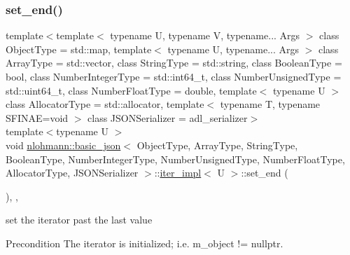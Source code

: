 \subsubsection{\texorpdfstring{set\+\_\+end()}{set\_end()}}
{\footnotesize\ttfamily template$<$template$<$ typename U, typename V, typename... Args $>$ class Object\+Type = std\+::map, template$<$ typename U, typename... Args $>$ class Array\+Type = std\+::vector, class String\+Type  = std\+::string, class Boolean\+Type  = bool, class Number\+Integer\+Type  = std\+::int64\+\_\+t, class Number\+Unsigned\+Type  = std\+::uint64\+\_\+t, class Number\+Float\+Type  = double, template$<$ typename U $>$ class Allocator\+Type = std\+::allocator, template$<$ typename T, typename S\+F\+I\+N\+A\+E=void $>$ class J\+S\+O\+N\+Serializer = adl\+\_\+serializer$>$ \\
template$<$typename U $>$ \\
void \hyperlink{classnlohmann_1_1basic__json}{nlohmann\+::basic\+\_\+json}$<$ Object\+Type, Array\+Type, String\+Type, Boolean\+Type, Number\+Integer\+Type, Number\+Unsigned\+Type, Number\+Float\+Type, Allocator\+Type, J\+S\+O\+N\+Serializer $>$\+::\hyperlink{classnlohmann_1_1basic__json_1_1iter__impl}{iter\+\_\+impl}$<$ U $>$\+::set\+\_\+end (\begin{DoxyParamCaption}{ }\end{DoxyParamCaption})\hspace{0.3cm}{\ttfamily [inline]}, {\ttfamily [private]}, {\ttfamily [noexcept]}}



set the iterator past the last value 

\begin{DoxyPrecond}{Precondition}
The iterator is initialized; i.\+e. {\ttfamily m\+\_\+object != nullptr}. 
\end{DoxyPrecond}
\mbox{\label{classnlohmann_1_1basic__json_1_1iter__impl_a92e849ca687355935c02f492be936b68}} 
